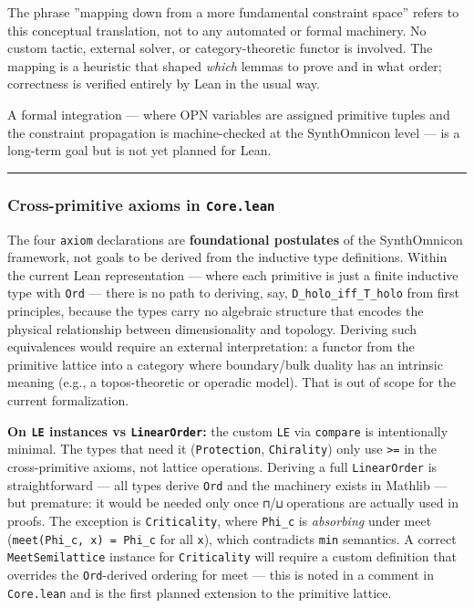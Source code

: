 \documentclass[12pt,a4paper]{article}
\begin{document}
The phrase ''mapping down from a more fundamental constraint space'' refers to this conceptual
translation, not to any automated or formal machinery. No custom tactic, external solver, or
category-theoretic functor is involved. The mapping is a heuristic that shaped \emph{which} lemmas
to prove and in what order; correctness is verified entirely by Lean in the usual way.

A formal integration --- where OPN variables are assigned primitive tuples and the constraint
propagation is machine-checked at the SynthOmnicon level --- is a long-term goal but is not yet
planned for Lean.

\begin{center}
\rule{0.5\textwidth}{0.4pt}
\end{center}

\subsubsection{Cross-primitive axioms in \texttt{Core.lean}}

The four \texttt{axiom} declarations are \textbf{foundational postulates} of the SynthOmnicon framework,
not goals to be derived from the inductive type definitions. Within the current Lean
representation --- where each primitive is just a finite inductive type with \texttt{Ord} --- there is
no path to deriving, say, \texttt{D\_holo\_iff\_T\_holo} from first principles, because the types carry
no algebraic structure that encodes the physical relationship between dimensionality and topology.
Deriving such equivalences would require an external interpretation: a functor from the primitive
lattice into a category where boundary/bulk duality has an intrinsic meaning (e.g., a
topos-theoretic or operadic model). That is out of scope for the current formalization.

\textbf{On \texttt{LE} instances vs \texttt{LinearOrder}:} the custom \texttt{LE} via \texttt{compare} is intentionally minimal.
The types that need it (\texttt{Protection}, \texttt{Chirality}) only use \texttt{\textgreater{}=} in the cross-primitive axioms,
not lattice operations. Deriving a full \texttt{LinearOrder} is straightforward --- all types derive \texttt{Ord}
and the machinery exists in Mathlib --- but premature: it would be needed only once \texttt{⊓}/\texttt{⊔}
operations are actually used in proofs. The exception is \texttt{Criticality}, where \texttt{Phi\_c} is
\emph{absorbing} under meet (\texttt{meet(Phi\_c, x) = Phi\_c} for all \texttt{x}), which contradicts \texttt{min} semantics.
A correct \texttt{MeetSemilattice} instance for \texttt{Criticality} will require a custom definition that
overrides the \texttt{Ord}-derived ordering for meet --- this is noted in a comment in \texttt{Core.lean} and
is the first planned extension to the primitive lattice.
\end{document}
